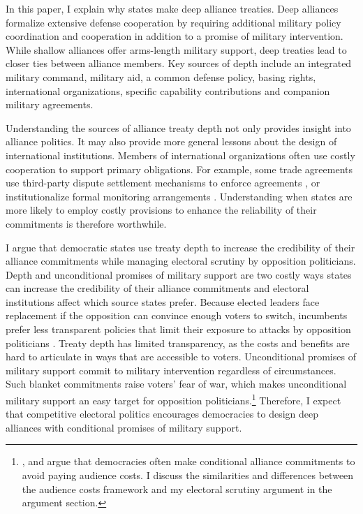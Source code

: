 \documentclass[12pt]{article}
\begin{document}
In this paper, I explain why states make deep alliance treaties. 
Deep alliances formalize extensive defense cooperation by requiring additional military policy coordination and cooperation in addition to a promise of military intervention. 
While shallow alliances offer arms-length military support, deep treaties lead to closer ties between alliance members. 
Key sources of depth include an integrated military command, military aid, a common defense policy, basing rights, international organizations, specific capability contributions and companion military agreements. 


Understanding the sources of alliance treaty depth not only provides insight into alliance politics.
It may also provide more general lessons about the design of international institutions. 
Members of international organizations often use costly cooperation to support primary obligations. 
For example, some trade agreements use third-party dispute settlement mechanisms to enforce agreements \citep{Smith2000}, or institutionalize formal monitoring arrangements \citep{Duretal2013}.  
Understanding when states are more likely to employ costly provisions to enhance the reliability of their commitments is therefore worthwhile. 


I argue that democratic states use treaty depth to increase the credibility of their alliance commitments while managing electoral scrutiny by opposition politicians.
Depth and unconditional promises of military support are two costly ways states can increase the credibility of their alliance commitments and electoral institutions affect which source states prefer.
Because elected leaders face replacement if the opposition can convince enough voters to switch, incumbents prefer less transparent policies that limit their exposure to attacks by opposition politicians \citep{Kono2006}.
Treaty depth has limited transparency, as the costs and benefits are hard to articulate in ways that are accessible to voters. 
Unconditional promises of military support commit to military intervention regardless of circumstances.  
Such blanket commitments raise voters' fear of war, which makes unconditional military support an easy target for opposition politicians.\footnote{\citet{Mattes2012}, \citet{Chibaetal2015} and \citet{FjelstulReiter2019} argue that democracies often make conditional alliance commitments to avoid paying audience costs. I discuss the similarities and differences between the audience costs framework and my electoral scrutiny argument in the argument section.} 
Therefore, I expect that competitive electoral politics encourages democracies to design deep alliances with conditional promises of military support. 
\end{document}

